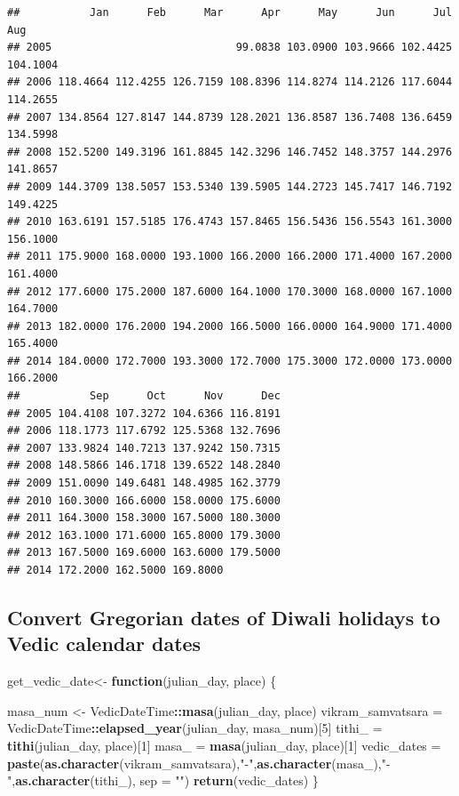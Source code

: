\documentclass[
]{article}
\newenvironment{Shaded}{\begin{snugshade}}{\end{snugshade}}
\newcommand{\AttributeTok}[1]{\textcolor[rgb]{0.13,0.29,0.53}{#1}}
\newcommand{\ControlFlowTok}[1]{\textcolor[rgb]{0.13,0.29,0.53}{\textbf{#1}}}
\newcommand{\DecValTok}[1]{\textcolor[rgb]{0.00,0.00,0.81}{#1}}
\newcommand{\FunctionTok}[1]{\textcolor[rgb]{0.13,0.29,0.53}{\textbf{#1}}}
\newcommand{\NormalTok}[1]{#1}
\newcommand{\OtherTok}[1]{\textcolor[rgb]{0.56,0.35,0.01}{#1}}
\newcommand{\SpecialCharTok}[1]{\textcolor[rgb]{0.81,0.36,0.00}{\textbf{#1}}}
\newcommand{\StringTok}[1]{\textcolor[rgb]{0.31,0.60,0.02}{#1}}
\begin{document}
\begin{verbatim}
##           Jan      Feb      Mar      Apr      May      Jun      Jul      Aug
## 2005                             99.0838 103.0900 103.9666 102.4425 104.1004
## 2006 118.4664 112.4255 126.7159 108.8396 114.8274 114.2126 117.6044 114.2655
## 2007 134.8564 127.8147 144.8739 128.2021 136.8587 136.7408 136.6459 134.5998
## 2008 152.5200 149.3196 161.8845 142.3296 146.7452 148.3757 144.2976 141.8657
## 2009 144.3709 138.5057 153.5340 139.5905 144.2723 145.7417 146.7192 149.4225
## 2010 163.6191 157.5185 176.4743 157.8465 156.5436 156.5543 161.3000 156.1000
## 2011 175.9000 168.0000 193.1000 166.2000 166.2000 171.4000 167.2000 161.4000
## 2012 177.6000 175.2000 187.6000 164.1000 170.3000 168.0000 167.1000 164.7000
## 2013 182.0000 176.2000 194.2000 166.5000 166.0000 164.9000 171.4000 165.4000
## 2014 184.0000 172.7000 193.3000 172.7000 175.3000 172.0000 173.0000 166.2000
##           Sep      Oct      Nov      Dec
## 2005 104.4108 107.3272 104.6366 116.8191
## 2006 118.1773 117.6792 125.5368 132.7696
## 2007 133.9824 140.7213 137.9242 150.7315
## 2008 148.5866 146.1718 139.6522 148.2840
## 2009 151.0090 149.6481 148.4985 162.3779
## 2010 160.3000 166.6000 158.0000 175.6000
## 2011 164.3000 158.3000 167.5000 180.3000
## 2012 163.1000 171.6000 165.8000 179.3000
## 2013 167.5000 169.6000 163.6000 179.5000
## 2014 172.2000 162.5000 169.8000
\end{verbatim}

\hypertarget{convert-gregorian-dates-of-diwali-holidays-to-vedic-calendar-dates}{%
\subsection{Convert Gregorian dates of Diwali holidays to Vedic calendar
dates}\label{convert-gregorian-dates-of-diwali-holidays-to-vedic-calendar-dates}}

\begin{Shaded}
\begin{Highlighting}[]
\NormalTok{get\_vedic\_date}\OtherTok{\textless{}{-}} \ControlFlowTok{function}\NormalTok{(julian\_day, place) \{}
  
\NormalTok{masa\_num }\OtherTok{\textless{}{-}}\NormalTok{ VedicDateTime}\SpecialCharTok{::}\FunctionTok{masa}\NormalTok{(julian\_day, place)}
\NormalTok{vikram\_samvatsara }\OtherTok{=}\NormalTok{ VedicDateTime}\SpecialCharTok{::}\FunctionTok{elapsed\_year}\NormalTok{(julian\_day, masa\_num)[}\DecValTok{5}\NormalTok{]}
\NormalTok{tithi\_ }\OtherTok{=} \FunctionTok{tithi}\NormalTok{(julian\_day, place)[}\DecValTok{1}\NormalTok{]}
\NormalTok{masa\_ }\OtherTok{=} \FunctionTok{masa}\NormalTok{(julian\_day, place)[}\DecValTok{1}\NormalTok{]}
\NormalTok{vedic\_dates }\OtherTok{=} \FunctionTok{paste}\NormalTok{(}\FunctionTok{as.character}\NormalTok{(vikram\_samvatsara),}\StringTok{"{-}"}\NormalTok{,}\FunctionTok{as.character}\NormalTok{(masa\_),}\StringTok{"{-}"}\NormalTok{,}\FunctionTok{as.character}\NormalTok{(tithi\_), }\AttributeTok{sep =} \StringTok{""}\NormalTok{) }
\FunctionTok{return}\NormalTok{(vedic\_dates)}
\NormalTok{\}}
\end{Highlighting}
\end{Shaded}
\end{document}
